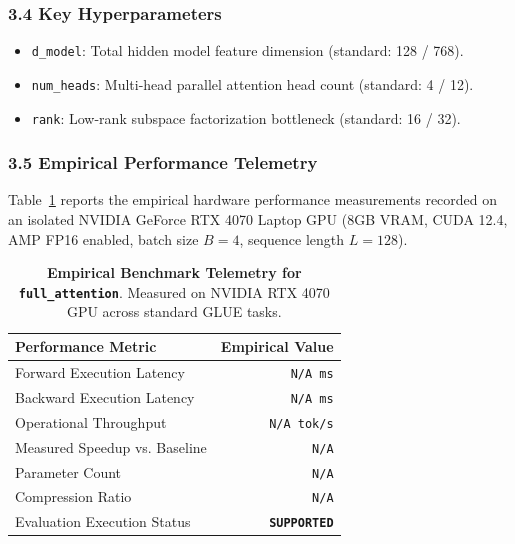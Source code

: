 \subsubsection*{3.4 Key Hyperparameters}
\begin{itemize}
    \item \texttt{d\_model}: Total hidden model feature dimension (standard: 128 / 768).
    \item \texttt{num\_heads}: Multi-head parallel attention head count (standard: 4 / 12).
    \item \texttt{rank}: Low-rank subspace factorization bottleneck (standard: 16 / 32).
\end{itemize}

\subsubsection*{3.5 Empirical Performance Telemetry}
Table~\ref{tab:telemetry_full_attention} reports the empirical hardware performance measurements recorded on an isolated NVIDIA GeForce RTX 4070 Laptop GPU (8GB VRAM, CUDA 12.4, AMP FP16 enabled, batch size $B=4$, sequence length $L=128$).

\begin{table}[h]
\centering
\small
\caption{\textbf{Empirical Benchmark Telemetry for \texttt{full\_attention}}. Measured on NVIDIA RTX 4070 GPU across standard GLUE tasks.}
\label{tab:telemetry_full_attention}
\begin{tabular*}{\columnwidth}{@{\extracolsep{\fill}}lr}
\toprule
\textbf{Performance Metric} & \textbf{Empirical Value} \\
\midrule
Forward Execution Latency & \texttt{N/A ms} \\
Backward Execution Latency & \texttt{N/A ms} \\
Operational Throughput & \texttt{N/A tok/s} \\
Measured Speedup vs. Baseline & \texttt{N/A} \\
Parameter Count & \texttt{N/A} \\
Compression Ratio & \texttt{N/A} \\
Evaluation Execution Status & \textbf{\texttt{SUPPORTED}} \\
\bottomrule
\end{tabular*}
\end{table}


